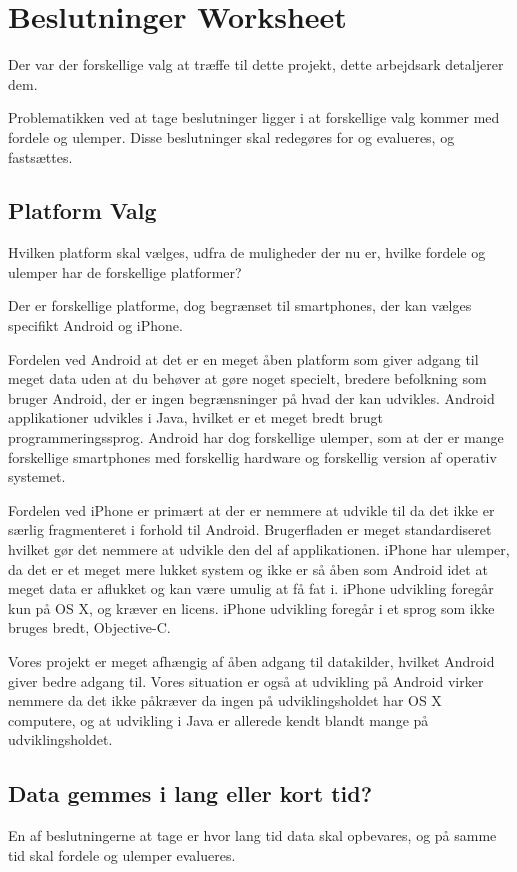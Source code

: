 \chapter{Beslutninger Worksheet}
Der var der forskellige valg at træffe til dette projekt, dette arbejdsark detaljerer dem.
 
Problematikken ved at tage beslutninger ligger i at forskellige valg kommer med fordele og ulemper.
Disse beslutninger skal redegøres for og evalueres, og fastsættes.

\section{Platform Valg}
Hvilken platform skal vælges, udfra de muligheder der nu er, hvilke fordele og ulemper har de forskellige platformer?

Der er forskellige platforme, dog begrænset til smartphones, der kan vælges specifikt Android og iPhone. 

Fordelen ved Android at det er en meget åben platform som giver adgang til meget data uden at du behøver at gøre noget specielt, bredere befolkning som bruger Android, der er ingen begrænsninger på hvad der kan udvikles. Android applikationer udvikles i Java, hvilket er et meget bredt brugt programmeringssprog.
Android har dog forskellige ulemper, som at der er mange forskellige smartphones med forskellig hardware og forskellig version af operativ systemet. 

Fordelen ved iPhone er primært at der er nemmere at udvikle til da det ikke er særlig fragmenteret i forhold til Android. Brugerfladen er meget standardiseret hvilket gør det nemmere at udvikle den del af applikationen. 
iPhone har ulemper, da det er et meget mere lukket system og ikke er så åben som Android idet at meget data er aflukket og kan være umulig at få fat i. iPhone udvikling foregår kun på OS X, og kræver en licens. iPhone udvikling foregår i et sprog som ikke bruges bredt, Objective-C.

Vores projekt er meget afhængig af åben adgang til datakilder, hvilket Android giver bedre adgang til. Vores situation er også at udvikling på Android virker nemmere da det ikke påkræver da ingen på udviklingsholdet har OS X computere, og at udvikling i Java er allerede kendt blandt mange på udviklingsholdet.

\section{Data gemmes i lang eller kort tid?}
En af beslutningerne at tage er hvor lang tid data skal opbevares, og på samme tid skal fordele og ulemper evalueres. 

